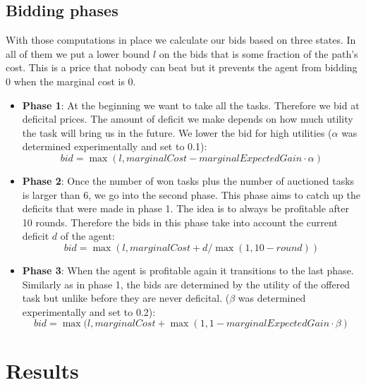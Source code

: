 \documentclass[11pt]{article}
\begin{document}
\subsection{Bidding phases}

With those computations in place we calculate our bids based on three states. 
In all of them we put a lower bound $l$ on the bids that is some fraction of the 
path's cost. This is a price that nobody can beat but it prevents the agent from 
bidding 0 when the marginal cost is 0.

\begin{itemize}
  
  \item
  
  \textbf{Phase 1}: At the beginning we want to take all the tasks. Therefore we
  bid at deficital prices. The amount of deficit we make depends on how much
  utility the task will bring us in the future. We lower the bid for high
  utilities ($\alpha$ was determined experimentally and set to 0.1): 
  $$ 
  bid = \max(l, marginalCost - marginalExpectedGain \cdot \alpha) 
  $$
  
  \item 
   
  \textbf{Phase 2}: Once the number of won tasks plus the number of auctioned
  tasks is larger than 6, we go into the second phase. This phase aims to catch
  up the deficits that were made in phase 1. The idea is to always be profitable
  after 10 rounds. Therefore the bids in this phase take into account the 
  current deficit $d$ of the agent:
  $$
  bid = \max(l, marginalCost + d/\max(1, 10 - round))
  $$
  
  \item 
   
  \textbf{Phase 3}: When the agent is profitable again it transitions to the
  last phase. Similarly as in phase 1, the bids are determined by the utility of
  the offered task but unlike before they are never deficital.
  ($\beta$ was determined experimentally and set to 0.2):
  $$ 
  bid = \max(l, marginalCost + \max(1, 1 - marginalExpectedGain \cdot \beta) 
  $$
  
  
\end{itemize}


\section{Results}

\end{document}
